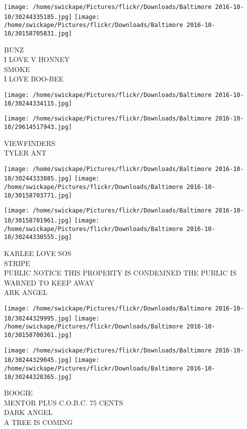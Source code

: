 \documentclass[10pt,letterpaper]{article}
\begin{document}
\texttt{[image: /home/swickape/Pictures/flickr/Downloads/Baltimore 2016-10-10/30244335185.jpg]}
\texttt{[image: /home/swickape/Pictures/flickr/Downloads/Baltimore 2016-10-10/30158705831.jpg]}

BUNZ\\
I LOVE V HONNEY\\
SMOKE\\
I LOVE BOO{-}BEE\\
\pagebreak

\texttt{[image: /home/swickape/Pictures/flickr/Downloads/Baltimore 2016-10-10/30244334115.jpg]}

\vspace{0.25in}
\texttt{[image: /home/swickape/Pictures/flickr/Downloads/Baltimore 2016-10-10/29614517943.jpg]}

VIEWFINDERS\\
TYLER ANT\\
\pagebreak

\texttt{[image: /home/swickape/Pictures/flickr/Downloads/Baltimore 2016-10-10/30244333085.jpg]}
\texttt{[image: /home/swickape/Pictures/flickr/Downloads/Baltimore 2016-10-10/30158703771.jpg]}

\texttt{[image: /home/swickape/Pictures/flickr/Downloads/Baltimore 2016-10-10/30158701961.jpg]}
\texttt{[image: /home/swickape/Pictures/flickr/Downloads/Baltimore 2016-10-10/30244330555.jpg]}

KARLEE LOVE SOS\\
STRIPE\\
PUBLIC NOTICE THIS PROPERTY IS CONDEMNED THE PUBLIC IS WARNED TO KEEP AWAY\\
ARK ANGEL\\
\pagebreak

\texttt{[image: /home/swickape/Pictures/flickr/Downloads/Baltimore 2016-10-10/30244329995.jpg]}
\texttt{[image: /home/swickape/Pictures/flickr/Downloads/Baltimore 2016-10-10/30158700361.jpg]}

\texttt{[image: /home/swickape/Pictures/flickr/Downloads/Baltimore 2016-10-10/30244329045.jpg]}
\texttt{[image: /home/swickape/Pictures/flickr/Downloads/Baltimore 2016-10-10/30244328365.jpg]}

BOOGIE\\
MENTOR PLUS C.O.B.C. 75 CENTS\\
DARK ANGEL\\
A TREE IS COMING\\
\pagebreak
\end{document}
